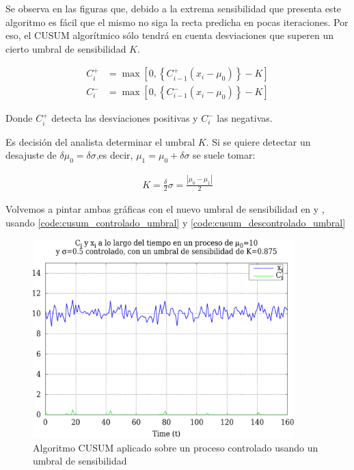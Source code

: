 Se observa en las figuras que, debido a la extrema sensibilidad que presenta este algoritmo es fácil que el mismo no 
siga la recta predicha en pocas iteraciones. Por eso, el \gls{CUSUM} algorítmico  sólo tendrá en cuenta desviaciones 
que superen un cierto umbral de sensibilidad $K$.

\begin{align}
 C_i^+ &= \max \left[0,\left\{C_{i-1}^+\left(x_i-\mu_0\right)\right\}-K\right] \\
 C_i^- &= \max \left[0,\left\{C_{i-1}^-\left(x_i-\mu_0\right)\right\}-K\right]
\end{align}

Donde $C_i^+$ detecta las desviaciones positivas y $C_i^-$ las negativas.

Es decisión del analista determinar el umbral $K$. Si se quiere detectar un desajuste de $\delta\mu_0=\delta\sigma$,es 
decir, $\mu_1 = \mu_0 + \delta\sigma$ se suele tomar:

\begin{align}
 K = \frac{\delta}{2}\sigma = \frac{\left|\mu_0-\mu_1\right|}{2}
\end{align}

Volvemos a pintar ambas gráficas con el nuevo umbral de sensibilidad en  y 
, usando \autoref{code:cusum_controlado_umbral} y 
\autoref{code:cusum_descontrolado_umbral}

\begin{figure}[htbp]
\centering
\includegraphics[width=0.9\textwidth]{CapituloCusum/Figuras/cusumControladoUmbral-crop}
\caption{Algoritmo CUSUM aplicado sobre un proceso controlado usando un umbral de sensibilidad}
\end{figure}
%

